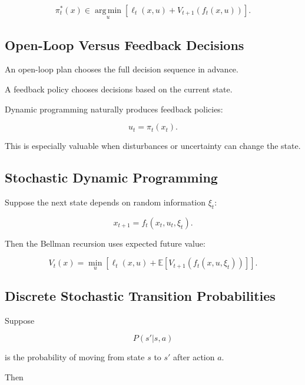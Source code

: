 \[
\boxed{
\pi_t^*(x)
\in
\operatorname*{arg\,min}_u
\left[
\ell_t(x,u)
+
V_{t+1}(f_t(x,u))
\right].
}
\]

\subsection{Open-Loop Versus Feedback Decisions}
\label{subsec:open-loop-feedback}

An open-loop plan chooses the full decision sequence in advance.

A feedback policy chooses decisions based on the current state.

Dynamic programming naturally produces feedback policies:

\[
\boxed{
u_t=\pi_t(x_t).
}
\]

This is especially valuable when disturbances or uncertainty can change
the state.

\subsection{Stochastic Dynamic Programming}
\label{subsec:stochastic-dynamic-programming}

Suppose the next state depends on random information \(\xi_t\):

\[
\boxed{
x_{t+1}
=
f_t
(
x_t,
u_t,
\xi_t
).
}
\]

Then the Bellman recursion uses expected future value:

\[
\boxed{
V_t(x)
=
\min_u
\left[
\ell_t(x,u)
+
\mathbb{E}
\left[
V_{t+1}
(
f_t(x,u,\xi_t)
)
\right]
\right].
}
\]

\subsection{Discrete Stochastic Transition Probabilities}
\label{subsec:stochastic-transition-probabilities}

Suppose

\[
P(s'|s,a)
\]

is the probability of moving from state \(s\) to \(s'\) after action
\(a\).

Then

